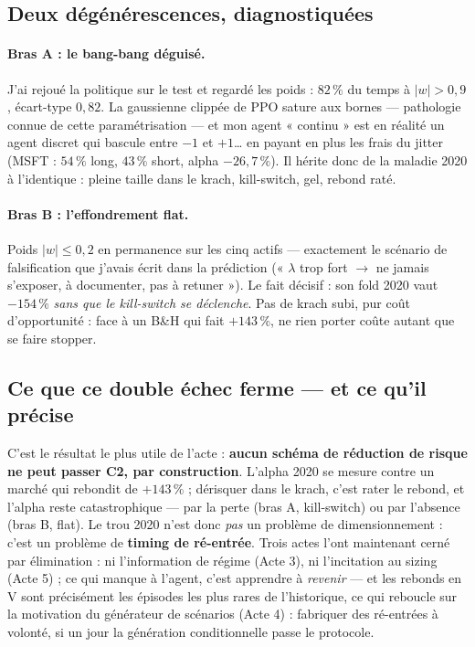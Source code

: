 \documentclass[11pt,a4paper]{article}
\begin{document}
\subsection{Deux dégénérescences, diagnostiquées}

\paragraph{Bras A : le bang-bang déguisé.} J'ai rejoué la politique sur le test
et regardé les poids : $82\,\%$ du temps à $|w| > 0{,}9$, écart-type $0{,}82$.
La gaussienne clippée de PPO sature aux bornes --- pathologie connue de cette
paramétrisation --- et mon agent « continu » est en réalité un agent discret qui
bascule entre $-1$ et $+1$\ldots{} en payant en plus les frais du jitter (MSFT :
$54\,\%$ long, $43\,\%$ short, alpha $-26{,}7\,\%$). Il hérite donc de la maladie
2020 à l'identique : pleine taille dans le krach, kill-switch, gel, rebond raté.

\paragraph{Bras B : l'effondrement flat.} Poids $|w| \leq 0{,}2$ en permanence sur
les cinq actifs --- exactement le scénario de falsification que j'avais écrit dans
la prédiction (« $\lambda$ trop fort $\to$ ne jamais s'exposer, à documenter, pas
à retuner »). Le fait décisif : son fold 2020 vaut $-154\,\%$ \emph{sans que le
kill-switch se déclenche}. Pas de krach subi, pur coût d'opportunité : face à un
B\&H qui fait $+143\,\%$, ne rien porter coûte autant que se faire stopper.

\subsection{Ce que ce double échec ferme --- et ce qu'il précise}

C'est le résultat le plus utile de l'acte : \textbf{aucun schéma de réduction de
risque ne peut passer C2, par construction}. L'alpha 2020 se mesure contre un
marché qui rebondit de $+143\,\%$ ; dérisquer dans le krach, c'est rater le
rebond, et l'alpha reste catastrophique --- par la perte (bras A, kill-switch) ou
par l'absence (bras B, flat). Le trou 2020 n'est donc \emph{pas} un problème de
dimensionnement : c'est un problème de \textbf{timing de ré-entrée}. Trois actes
l'ont maintenant cerné par élimination : ni l'information de régime (Acte 3), ni
l'incitation au sizing (Acte 5) ; ce qui manque à l'agent, c'est apprendre à
\emph{revenir} --- et les rebonds en V sont précisément les épisodes les plus
rares de l'historique, ce qui reboucle sur la motivation du générateur de
scénarios (Acte 4) : fabriquer des ré-entrées à volonté, si un jour la génération
conditionnelle passe le protocole.
\end{document}
